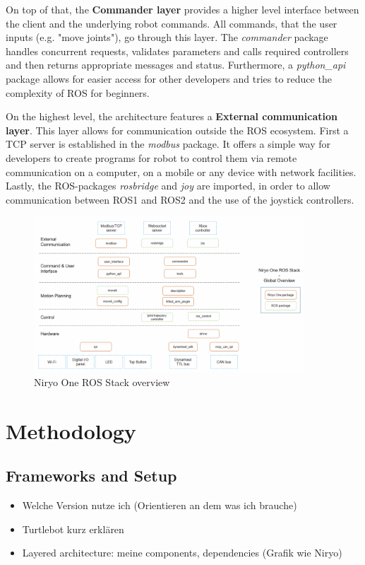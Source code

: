 \documentclass[]{article}
\begin{document}
	On top of that, the \textbf{Commander layer} provides a higher level interface between the client and the underlying robot commands. All commands, that the user inputs (e.g. "move joints"), go through this layer. The \textit{commander} package handles concurrent requests, validates parameters and calls required controllers and then returns appropriate messages and status. 
	Furthermore, a \textit{python\_api} package allows for easier access for other developers and tries to reduce the complexity of ROS for beginners. \autocite{roboticsGetStartedNiryo2024,roboticsNiryoOneROS2024}
	
	On the highest level, the architecture features a \textbf{External communication layer}.  This layer allows for communication outside the ROS ecosystem. First a TCP server is established in the \textit{modbus} package. It offers a simple way for developers to create programs for robot to control them via remote communication on a computer, on a mobile or any device with network facilities. Lastly, the ROS-packages \textit{rosbridge} and \textit{joy} are imported, in order to allow communication between ROS1 and ROS2 and the use of the joystick controllers. \autocite{roboticsGetStartedNiryo2024,roboticsNiryoOneROS2024}
	
	
	\begin{figure}[ht]
		\centering
		\includegraphics[width=0.9\textwidth]{Graphics/Niryo}
		\caption{Niryo One ROS Stack overview \autocite{roboticsNiryoOneROS2024}}
		\label{fig: fig6}
	\end{figure}
	
	
	\section{Methodology}
	\subsection{Frameworks and Setup}
	\begin{itemize}
		\item Welche Version nutze ich (Orientieren an dem was ich brauche)
		\item Turtlebot kurz erklären
		\item Layered architecture: meine components, dependencies (Grafik wie Niryo)
	\end{itemize}
	
\end{document}

